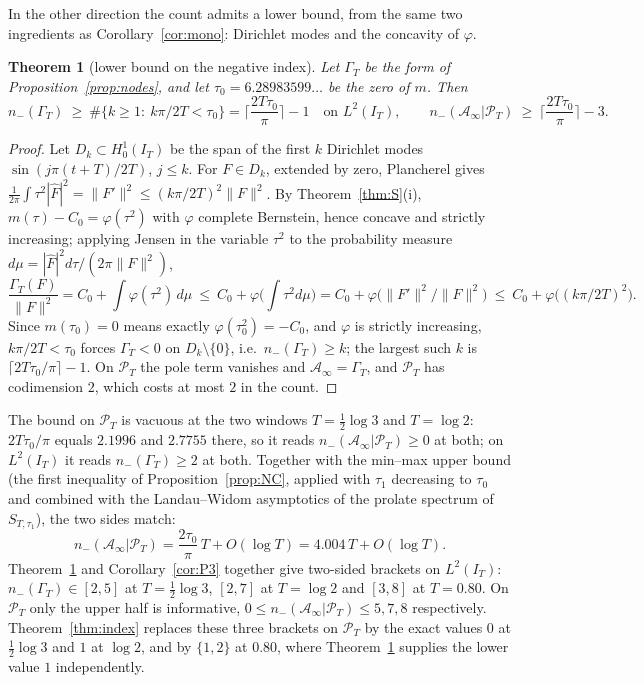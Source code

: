 \documentclass[11pt]{amsart}
\newtheorem{theorem}{Theorem}[section]
\theoremstyle{definition}
\theoremstyle{remark}
\newcommand{\PT}{\mathcal P_T}
\newcommand{\IT}{I_T}
\newcommand{\Fh}{\widehat F}
\newcommand{\Ainf}{\mathcal A_\infty}
\begin{document}
In the other direction the count admits a lower bound, from the same two ingredients as
Corollary~\ref{cor:mono}: Dirichlet modes and the concavity of $\varphi$.

\begin{theorem}[lower bound on the negative index]\label{thm:J}
Let $\Gamma_T$ be the form of Proposition~\ref{prop:nodes}, and let $\tau_0=6.28983599\ldots$ be the zero of $m$. Then
\[
n_-(\Gamma_T)\ \ge\ \#\{k\ge1:\ k\pi/2T<\tau_0\}=\Big\lceil\frac{2T\tau_0}{\pi}\Big\rceil-1
\quad\text{on }L^2(\IT),\qquad
n_-(\Ainf|\PT)\ \ge\ \Big\lceil\frac{2T\tau_0}{\pi}\Big\rceil-3 .
\]
\end{theorem}
\begin{proof}
Let $D_k\subset H^1_0(\IT)$ be the span of the first $k$ Dirichlet modes $\sin(j\pi(t+T)/2T)$,
$j\le k$. For $F\in D_k$, extended by zero, Plancherel gives
$\frac1{2\pi}\int\tau^2|\Fh|^2=\|F'\|^2\le(k\pi/2T)^2\|F\|^2$. By Theorem~\ref{thm:S}(i),
$m(\tau)-C_0=\varphi(\tau^2)$ with $\varphi$ complete Bernstein, hence concave and strictly
increasing; applying Jensen in the variable $\tau^2$ to the probability measure
$d\mu=|\Fh|^2d\tau/(2\pi\|F\|^2)$,
\[
\frac{\Gamma_T(F)}{\|F\|^2}=C_0+\int\varphi(\tau^2)\,d\mu\ \le\ C_0+\varphi\Big(\int\tau^2d\mu\Big)
=C_0+\varphi\big(\|F'\|^2/\|F\|^2\big)\ \le\ C_0+\varphi\big((k\pi/2T)^2\big).
\]
Since $m(\tau_0)=0$ means exactly $\varphi(\tau_0^2)=-C_0$, and $\varphi$ is strictly increasing,
$k\pi/2T<\tau_0$ forces $\Gamma_T<0$ on $D_k\setminus\{0\}$, i.e.\ $n_-(\Gamma_T)\ge k$; the
largest such $k$ is $\lceil2T\tau_0/\pi\rceil-1$. On $\PT$ the pole term vanishes and
$\Ainf=\Gamma_T$, and $\PT$ has codimension $2$, which costs at most $2$ in the count.
\end{proof}
The bound on $\PT$ is vacuous at the two windows $T=\frac12\log3$ and $T=\log2$: $2T\tau_0/\pi$
equals $2.1996$ and $2.7755$ there, so it reads $n_-(\Ainf|\PT)\ge0$ at both; on $L^2(\IT)$ it reads
$n_-(\Gamma_T)\ge2$ at both. Together with the min--max upper bound (the first inequality of
Proposition~\ref{prop:NC}, applied with $\tau_1$ decreasing to $\tau_0$ and combined with the
Landau--Widom asymptotics of the prolate spectrum of $S_{T,\tau_1}$), the two sides match:
\[
n_-(\Ainf|\PT)=\frac{2\tau_0}{\pi}\,T+O(\log T)=4.004\,T+O(\log T).
\]
Theorem~\ref{thm:J} and Corollary~\ref{cor:P3} together give two-sided brackets on $L^2(\IT)$:
$n_-(\Gamma_T)\in[2,5]$ at $T=\frac12\log3$, $[2,7]$ at $T=\log2$ and $[3,8]$ at $T=0.80$. On $\PT$
only the upper half is informative, $0\le n_-(\Ainf|\PT)\le5,7,8$ respectively. Theorem~\ref{thm:index}
replaces these three brackets on $\PT$ by the exact values $0$ at $\frac12\log3$ and $1$ at $\log2$,
and by $\{1,2\}$ at $0.80$, where Theorem~\ref{thm:J} supplies the lower value $1$ independently.
\end{document}
